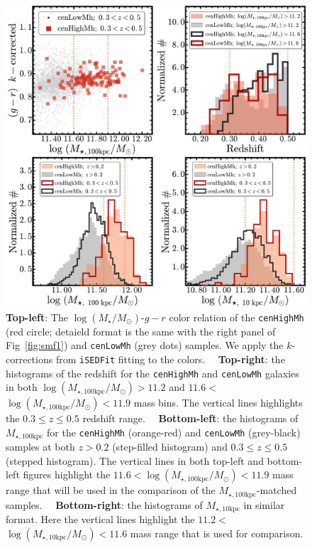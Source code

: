 \documentclass[a4paper,fleqn,usenatbib]{mnras}
\def\rbcg{\texttt{cenHighMh}}
\def\nbcg{\texttt{cenLowMh}}
\def\logms{{$\log (M_{\star}/M_{\odot})$}}
\def\minn{{$M_{\star,10\mathrm{kpc}}$}}
\def\mtot{{$M_{\star,100\mathrm{kpc}}$}}
\def\logminn{{$\log (M_{\star,10\mathrm{kpc}}/M_{\odot})$}}
\def\logmtot{{$\log (M_{\star,100\mathrm{kpc}}/M_{\odot})$}}
\begin{document}
  \begin{figure}
      \centering 
      \includegraphics[width=16.5cm]{fig/redbcg_sample_stats}
      \caption{
          \textbf{Top-left}: The \logms{}-$g-r$ color relation of the \rbcg{} 
          (red circle; detaield format is the same with the right panel of 
          Fig~\ref{fig:smf1}) and \nbcg{} (grey dots) samples.
          We apply the $k$-corrections from \texttt{iSEDFit} fitting to the colors.~~          
          \textbf{Top-right}: the histograms of the redshift for the \rbcg{} and 
          \nbcg{} galaxies in both \logmtot$>11.2$ and $11.6<$\logmtot{}$<11.9$
          mass bins.
          The vertical lines highlights the $0.3\leq z \leq 0.5$ redshift range.~~
          \textbf{Bottom-left}: the histograms of \mtot{} for the \rbcg{} (orange-red) 
          and \nbcg{} (grey-black) samples at both $z>0.2$ (step-filled histogram) and 
          $0.3 \leq z \leq 0.5$ (stepped histogram). 
          The vertical lines in both top-left and bottom-left figures highlight the 
          $11.6<$\logmtot{}$<11.9$ mass range that will be used in the comparison of 
          the \mtot{}-matched samples.~~
          \textbf{Bottom-right}: the histograms of \minn{} in similar format. 
          Here the vertical lines highlight the 
          $11.2<$\logminn{}$<11.6$ mass range that is used for comparison.
      }
      \label{fig:sample_stats}
  \end{figure}
    
\end{document}
